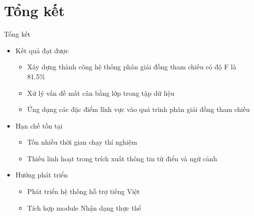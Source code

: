 \section{Tổng kết}
\begin{frame}{Tổng kết}
\putlogo
\begin{itemize}
\item Kết quả đạt được
\begin{itemize}
	\item Xây dựng thành công hệ thống phân giải đồng tham chiếu có độ F là {\color{red} 81.5\%}
	\item Xử lý vấn đề mất cân bằng lớp trong tập dữ liệu
	\item Ứng dụng các đặc điểm lĩnh vực vào quá trình phân giải đồng tham chiếu
\end{itemize}
\item Hạn chế tồn tại
\begin{itemize}
	\item Tốn nhiều thời gian chạy thí nghiệm
	\item Thiếu linh hoạt trong trích xuất thông tin từ điển và ngữ cảnh
\end{itemize}
\item Hướng phát triển
\begin{itemize}
	\item Phát triển hệ thống hỗ trợ tiếng Việt
	\item Tích hợp module Nhận dạng thực thể
\end{itemize}
\end{itemize}
\end{frame}
